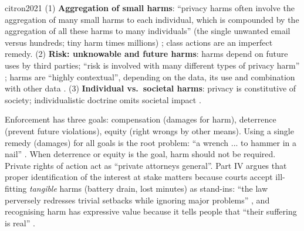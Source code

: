 \begin{papercard}{citron2021}
 (1) \textbf{Aggregation of small harms}: ``privacy harms often involve the aggregation of many small harms to each individual, which is compounded by the aggregation of all these harms to many individuals'' (the single unwanted email versus hundreds; tiny harm times millions) ; class actions are an imperfect remedy. (2) \textbf{Risk: unknowable and future harms}: harms depend on future uses by third parties; ``risk is involved with many different types of privacy harm'' ; harms are ``highly contextual'', depending on the data, its use and combination with other data . (3) \textbf{Individual vs.\ societal harms}: privacy is constitutive of society; individualistic doctrine omits societal impact .

 Enforcement has three goals: compensation (damages for harm), deterrence (prevent future violations), equity (right wrongs by other means). Using a single remedy (damages) for all goals is the root problem: ``a wrench ... to hammer in a nail'' . When deterrence or equity is the goal, harm should not be required. Private rights of action act as ``private attorneys general''. Part IV argues that proper identification of the interest at stake matters because courts accept ill-fitting \emph{tangible} harms (battery drain, lost minutes) as stand-ins: ``the law perversely redresses trivial setbacks while ignoring major problems'' , and recognising harm has expressive value because it tells people that ``their suffering is real'' .


\end{papercard}

